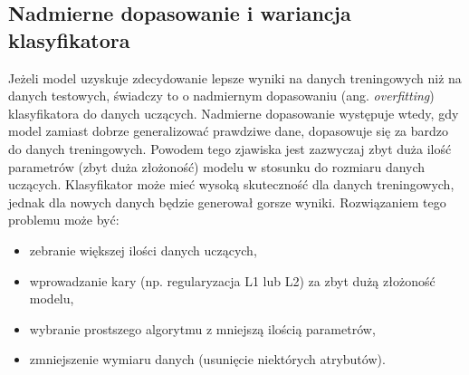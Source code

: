 \subsection{Nadmierne dopasowanie i wariancja klasyfikatora}
Jeżeli model uzyskuje zdecydowanie lepsze wyniki na danych treningowych niż na danych testowych, świadczy to o nadmiernym dopasowaniu (ang. \textit{overfitting}) klasyfikatora do danych uczących. Nadmierne dopasowanie występuje wtedy, gdy model zamiast dobrze generalizować prawdziwe dane, dopasowuje się za bardzo do danych treningowych. Powodem tego zjawiska jest zazwyczaj zbyt duża ilość parametrów (zbyt duża złożoność) modelu w stosunku do rozmiaru danych uczących. Klasyfikator może mieć wysoką skuteczność dla danych treningowych, jednak dla nowych danych będzie generował gorsze wyniki. Rozwiązaniem tego problemu może być:
\begin{itemize}
	\item zebranie większej ilości danych uczących,
	\item wprowadzanie kary (np. regularyzacja L1 lub L2) za zbyt dużą złożoność modelu,
	\item wybranie prostszego algorytmu z mniejszą ilością parametrów,
	\item zmniejszenie wymiaru danych (usunięcie niektórych atrybutów).
\end{itemize}

